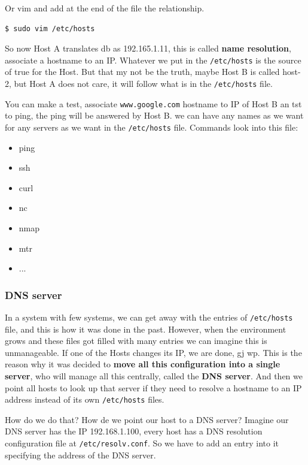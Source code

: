 \documentclass{article}
\newenvironment{codetemplate}[1][]{%
  \mybasecolorbox[#1]
  \itshape
}{%
  \endmybasecolorbox
}
\begin{document}
Or vim and add at the end of the file the relationship.
\begin{codetemplate}{}
\begin{verbatim}
$ sudo vim /etc/hosts
\end{verbatim}
\end{codetemplate}

So now Host A translates db as 192.165.1.11, this is called \textbf{name resolution}, associate a hostname to an IP. Whatever we put in the \verb|/etc/hosts| is the source of true for the Host. But that my not be the truth, maybe Host B is called host-2, but Host A does not care, it will follow what is in the \verb|/etc/hosts| file. 

You can make a test, associate \verb|www.google.com| hostname to IP of Host B an tst to ping, the ping will be answered by Host B. we can have any names as we want for any servers as we want in the \verb|/etc/hosts| file. Commands look into this file:

\begin{itemize}
    \item ping
    \item ssh
    \item curl
    \item nc
    \item nmap
    \item mtr
    \item ...
\end{itemize}

\subsubsection{DNS server}

In a system with few systems, we can get away with the entries of \verb|/etc/hosts| file, and this is how it was done in the past. However, when the environment grows and these files got filled with many entries we can imagine this is unmanageable. If one of the Hosts changes its IP, we are done, gj wp. This is the reason why it was decided to \textbf{move all this configuration into a single server}, who will manage all this centrally, called the \textbf{DNS server}. And then we point all hosts to look up that server if they need to resolve a hostname to an IP address instead of its own \verb|/etc/hosts| files.

How do we do that? How de we point our host to a DNS server? Imagine our DNS server has the IP 192.168.1.100, every host has a DNS resolution configuration file at \verb|/etc/resolv.conf|. So we have to add an entry into it specifying the address of the DNS server.
\end{document}
